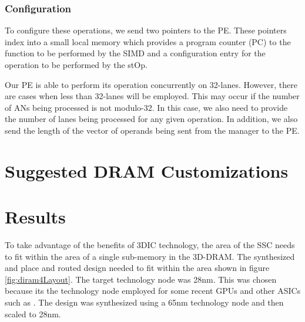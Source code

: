 \documentclass[journal]{IEEEtran}
\begin{document}
\subsubsection{Configuration}
\label{ssec:peConfiguration}

To configure these operations, we send two pointers to the PE. These pointers index into a small local memory which provides a program counter (PC) to the function to be performed by the SIMD and a configuration entry for the operation to be performed by the stOp.

Our PE is able to perform its operation concurrently on 32-lanes. However, there are cases when less than 32-lanes will be employed. This may occur if the number of ANs being processed is not modulo-32. In this case, we also need to provide the number of lanes being processed for any given operation. In addition, we also send the length of the vector of operands being sent from the manager to the PE.

\section{Suggested DRAM Customizations}
\label{sec:Suggested DRAM Customizations}



\section{Results}
\label{sec:Results}
To take advantage of the benefits of 3DIC technology, the area of the SSC needs to fit within the area of a single sub-memory in the 3D-DRAM.
The synthesized and place and routed design needed to fit within the area shown in figure \ref{fig:diram4Layout}.
The target technology node was 28nm. This was chosen because its the technology node employed for some recent GPUs and other ASICs such as \cite{jouppi2017datacenter}.
The design was synthesized using a 65nm technology node and then scaled to 28nm.
\end{document}
